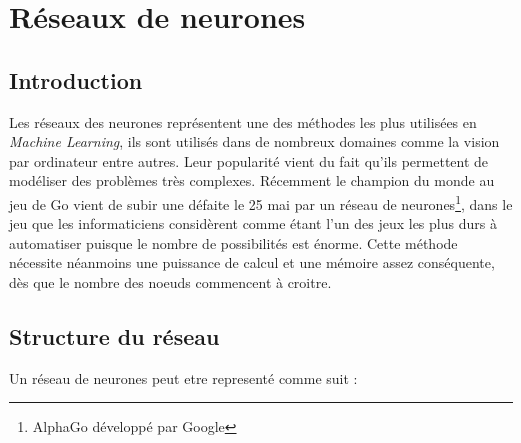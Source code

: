 \section{Réseaux de neurones}

\subsection{Introduction}

Les réseaux des neurones représentent une des méthodes les plus utilisées en \textit{Machine Learning}, ils sont utilisés dans de nombreux domaines comme la vision par ordinateur entre autres. Leur popularité vient du fait qu'ils permettent de modéliser des problèmes très complexes. Récemment le champion du monde au jeu de Go vient de subir une défaite le 25 mai par un réseau de neurones\footnote{AlphaGo développé par Google}, dans le jeu que les informaticiens considèrent comme étant l'un des jeux les plus durs à automatiser puisque le nombre de possibilités est énorme.
Cette méthode nécessite néanmoins une puissance de calcul et une mémoire assez conséquente, dès que le nombre des noeuds commencent à croitre.

\newpage

\subsection{Structure du réseau}

Un réseau de neurones peut etre representé comme suit :

\def\layersep{2.5cm}

